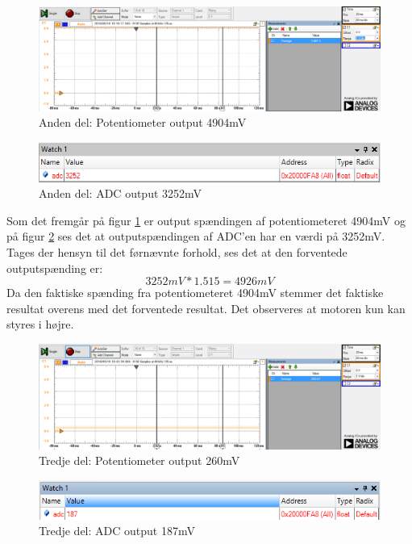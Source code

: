\begin{figure}[H]
	\centering
	\includegraphics[width=\textwidth]{test/images/ModultestADC/4904mVanalog}
	\caption{Anden del: Potentiometer output 4904mV}
	\label{figure:analoghoj}
\end{figure}
\begin{figure}[H]
	\centering
	\includegraphics[width=\textwidth]{test/images/ModultestADC/opDebug}
	\caption{Anden del: ADC output 3252mV}
	\label{figure: ADChoj}
\end{figure}
\noindent Som det fremgår på figur \ref{figure:analoghoj} er output spændingen af potentiometeret 4904mV og på figur \ref{figure: ADChoj} ses det at outputspændingen af ADC’en har en værdi på 3252mV. Tages der hensyn til det førnævnte forhold, ses det at den forventede outputspænding er:
\begin{equation}
3252mV * 1.515 = 4926mV
\end{equation}
Da den faktiske spænding fra potentiometeret 4904mV stemmer det faktiske resultat overens med det forventede resultat. Det observeres at motoren kun kan styres i højre.

\begin{figure}[H]
	\centering
	\includegraphics[width=\textwidth]{test/images/ModultestADC/260mVanalog}
	\caption{Tredje del: Potentiometer output 260mV}
	\label{figure:analoglav}
\end{figure}
\begin{figure}[H]
	\centering
	\includegraphics[width=\textwidth]{test/images/ModultestADC/nedDebug}
	\caption{Tredje del: ADC output 187mV}
	\label{figure: ADClav}
\end{figure}

